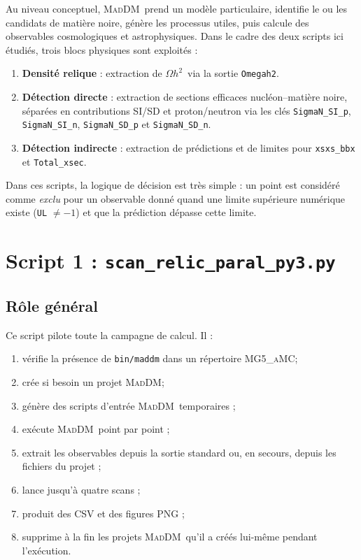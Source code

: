 \documentclass[11pt,a4paper]{article}
\newcommand{\script}[1]{\texttt{#1}}
\newcommand{\mad}{\textsc{MadDM}}
\newcommand{\mg}{\textsc{MG5\_aMC}}
\newcommand{\oh}{$\Omega h^2$}
\begin{document}
Au niveau conceptuel, \mad\ prend un modèle particulaire, identifie le ou les candidats de matière noire, génère les processus utiles, puis calcule des observables cosmologiques et astrophysiques. Dans le cadre des deux scripts ici étudiés, trois blocs physiques sont exploités :

\begin{enumerate}[leftmargin=1.4em]
\item \textbf{Densité relique} : extraction de \oh\ via la sortie \texttt{Omegah2}.
\item \textbf{Détection directe} : extraction de sections efficaces nucléon--matière noire, séparées en contributions SI/SD et proton/neutron via les clés \texttt{SigmaN\_SI\_p}, \texttt{SigmaN\_SI\_n}, \texttt{SigmaN\_SD\_p} et \texttt{SigmaN\_SD\_n}.
\item \textbf{Détection indirecte} : extraction de prédictions et de limites pour \texttt{xsxs\_bbx} et \texttt{Total\_xsec}.
\end{enumerate}

Dans ces scripts, la logique de décision est très simple : un point est considéré comme \emph{exclu} pour un observable donné quand une limite supérieure numérique existe (\texttt{UL} $\neq -1$) et que la prédiction dépasse cette limite.

\section{Script 1 : \script{scan\_relic\_paral\_py3.py}}

\subsection{Rôle général}

Ce script pilote toute la campagne de calcul. Il :
\begin{enumerate}[leftmargin=1.4em]
\item vérifie la présence de \script{bin/maddm} dans un répertoire \mg ;
\item crée si besoin un projet \mad ;
\item génère des scripts d'entrée \mad\ temporaires ;
\item exécute \mad\ point par point ;
\item extrait les observables depuis la sortie standard ou, en secours, depuis les fichiers du projet ;
\item lance jusqu'à quatre scans ;
\item produit des CSV et des figures PNG ;
\item supprime à la fin les projets \mad\ qu'il a créés lui-même pendant l'exécution.
\end{enumerate}
\end{document}
